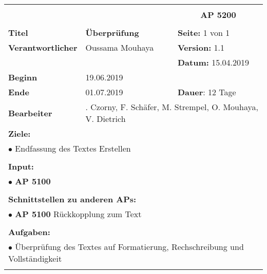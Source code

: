 \clearpage
\begin{table}[!h]
 \begin{center}
  \begin{tabular}{|p{35mm}||p{55mm}|p{50mm}||p{40mm}|}
   \hline
   \multicolumn{3}{|l||}{\textbf{}} & \multicolumn{1}{c|}{}\\
   \multicolumn{3}{|l||}{\textbf{}} & \multicolumn{1}{c|}{\textbf{AP 5200}}\\
   \multicolumn{3}{|l||}{\textbf{}} & \multicolumn{1}{c|}{}\\
   \hline\hline
   \textbf{Titel} & \multicolumn{2}{p{7cm}||}{\textbf{Überprüfung}} & \textbf{Seite:} 1 von 1\\
   \hline
   \textbf{Verantwortlicher} & \multicolumn{2}{l||}{Oussama Mouhaya} & \textbf{Version:} 1.1\\
   \hline
   \multicolumn{3}{|l||}{} & \textbf{Datum:} 15.04.2019\\
   \hline\hline
   \textbf{Beginn} & \multicolumn{2}{l||}{19.06.2019} & \\
   \hline
   \textbf{Ende} & \multicolumn{2}{l||}{01.07.2019} & \textbf{Dauer}: 12 Tage\\
   \hline\hline
   \textbf{Bearbeiter} & \multicolumn{3}{l|}{. Czorny, F. Schäfer, M. Strempel, O. Mouhaya, V. Dietrich}\\
   \hline\hline
   \multicolumn{4}{|p{150mm}|}{\textbf{Ziele:}}\\
   \multicolumn{4}{|p{150mm}|}{$\bullet$ Endfassung des Textes Erstellen}\\
   \multicolumn{4}{|p{150mm}|}{}\\
   \multicolumn{4}{|p{150mm}|}{\textbf{Input:}}\\
   \multicolumn{4}{|p{150mm}|}{$\bullet$ \textbf{AP 5100}}\\
   \multicolumn{4}{|p{150mm}|}{}\\
   \multicolumn{4}{|p{150mm}|}{\textbf{Schnittstellen zu anderen APs:}}\\
   \multicolumn{4}{|p{150mm}|}{$\bullet$ \textbf{AP 5100} Rückkopplung zum Text}\\
   \multicolumn{4}{|p{150mm}|}{}\\
   \multicolumn{4}{|p{150mm}|}{\textbf{Aufgaben:}}\\
   \multicolumn{4}{|p{150mm}|}{$\bullet$ Überprüfung des Textes auf Formatierung, Rechschreibung und Vollständigkeit}\\
   \multicolumn{4}{|p{150mm}|}{}\\
   \hline
  \end{tabular}
 \end{center}
\end{table}
\clearpage